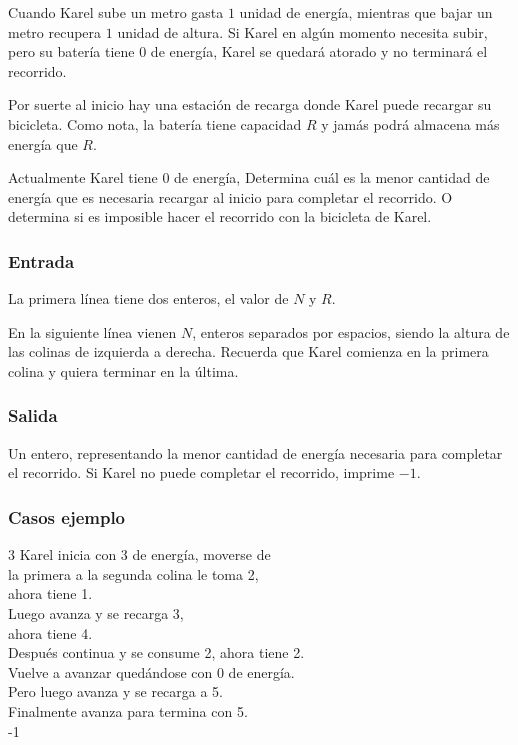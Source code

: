 Cuando Karel sube un metro gasta \(1\) unidad de energía, mientras que bajar un metro recupera \(1\) unidad de altura. Si Karel en algún momento necesita subir, pero su batería tiene 0 de energía, Karel se quedará atorado y no terminará el recorrido.

Por suerte al inicio hay una estación de recarga donde Karel puede recargar su bicicleta. Como nota, la batería tiene capacidad \(R\) y jamás podrá almacena más energía que \(R\).

Actualmente Karel tiene \(0\) de energía, Determina cuál es la menor cantidad de energía que es necesaria recargar al inicio para completar el recorrido. O determina si es imposible hacer el recorrido con la bicicleta de Karel.

\subsubsection*{Entrada}
La primera línea tiene dos enteros, el valor de \(N\) y \(R\).

En la siguiente línea vienen \(N\), enteros separados por espacios, siendo la altura de las colinas de izquierda a derecha. Recuerda que Karel comienza en la primera colina y quiera terminar en la última.
\subsubsection*{Salida}
Un entero, representando la menor cantidad de energía necesaria para completar el recorrido. Si Karel no puede completar el recorrido, imprime \(-1\).

\subsubsection*{Casos ejemplo}
\begin{casebox3}	
	{3}
	{
		Karel inicia con 3 de energía, moverse de   \\
		la primera a la segunda colina le toma 2,  \\
		ahora tiene 1.\\
		Luego avanza y se recarga 3,\\
		ahora tiene 4.\\
		Después continua y se consume 2, ahora tiene 2. \\
		Vuelve a avanzar quedándose con 0 de energía. \\		
		Pero luego avanza y se recarga a 5. \\
		Finalmente avanza para termina con 5. \\
	}
	{-1}
	{}
	\hline
\end{casebox3}	

